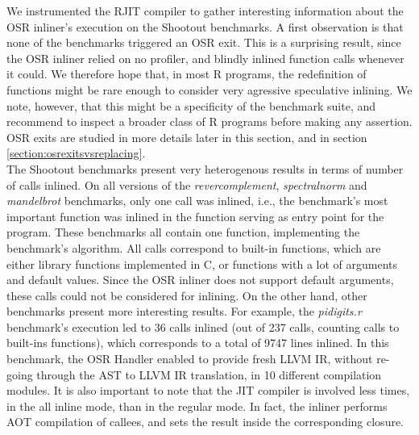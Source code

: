 We instrumented the RJIT compiler to gather interesting information about the OSR inliner's execution on the Shootout benchmarks.
A first observation is that none of the benchmarks triggered an OSR exit.
This is a surprising result, since the OSR inliner relied on no profiler, and blindly inlined function calls whenever it could.
We therefore hope that, in most R programs, the redefinition of functions might be rare enough to consider very agressive speculative inlining.
We note, however, that this might be a specificity of the benchmark suite, and recommend to inspect a broader class of R programs before making any assertion.
OSR exits are studied in more details later in this section, and in section \ref{section:osrexitsvsreplacing}.\\

The Shootout benchmarks present very heterogenous results in terms of number of calls inlined.
On all versions of the \textit{revercomplement}, \textit{spectralnorm} and \textit{mandelbrot} benchmarks, only one call was inlined, i.e., the benchmark's most important function was inlined in the function serving as entry point for the program.
These benchmarks all contain one function, implementing the benchmark's algorithm.
All calls correspond to built-in functions, which are either library functions implemented in C, or functions with a lot of arguments and default values.
Since the OSR inliner does not support default arguments, these calls could not be considered for inlining.
On the other hand, other benchmarks present more interesting results. 
For example, the \textit{pidigits.r} benchmark's execution led to 36 calls inlined (out of 237 calls, counting calls to built-ins functions), which corresponds to a total of 9747 lines inlined.
In this benchmark, the OSR Handler enabled to provide fresh LLVM IR, without re-going through the AST to LLVM IR translation, in 10 different compilation modules.
It is also important to note that the JIT compiler is involved less times, in the all inline mode, than in the regular mode.
In fact, the inliner performs AOT compilation of callees, and sets the result inside the corresponding closure.\\

